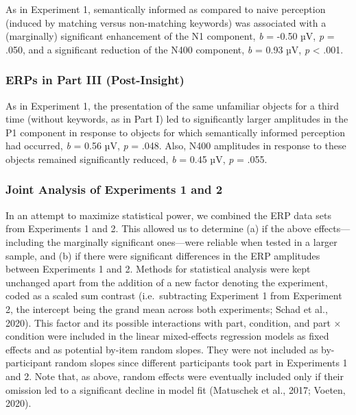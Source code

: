 \documentclass[
  english,
  man,11pt,floatsintext]{apa7}
\begin{document}
As in Experiment 1, semantically informed as compared to naive perception (induced by matching versus non-matching keywords) was associated with a (marginally) significant enhancement of the N1 component, \emph{b} = -0.50 µV, \emph{p} = .050, and a significant reduction of the N400 component, \emph{b} = 0.93 µV, \emph{p} \textless{} .001.

\hypertarget{erps-in-part-iii-post-insight-1}{%
\subsubsection{ERPs in Part III (Post-Insight)}\label{erps-in-part-iii-post-insight-1}}

As in Experiment 1, the presentation of the same unfamiliar objects for a third time (without keywords, as in Part I) led to significantly larger amplitudes in the P1 component in response to objects for which semantically informed perception had occurred, \emph{b} = 0.56 µV, \emph{p} = .048. Also, N400 amplitudes in response to these objects remained significantly reduced, \emph{b} = 0.45 µV, \emph{p} = .055.

\hypertarget{joint-analysis-of-experiments-1-and-2}{%
\subsubsection{Joint Analysis of Experiments 1 and 2}\label{joint-analysis-of-experiments-1-and-2}}

In an attempt to maximize statistical power, we combined the ERP data sets from Experiments 1 and 2. This allowed us to determine (a) if the above effects---including the marginally significant ones---were reliable when tested in a larger sample, and (b) if there were significant differences in the ERP amplitudes between Experiments 1 and 2. Methods for statistical analysis were kept unchanged apart from the addition of a new factor denoting the experiment, coded as a scaled sum contrast (i.e.~subtracting Experiment 1 from Experiment 2, the intercept being the grand mean across both experiments; Schad et al., 2020). This factor and its possible interactions with part, condition, and part × condition were included in the linear mixed-effects regression models as fixed effects and as potential by-item random slopes. They were not included as by-participant random slopes since different participants took part in Experiments 1 and 2. Note that, as above, random effects were eventually included only if their omission led to a significant decline in model fit (Matuschek et al., 2017; Voeten, 2020).
\end{document}
